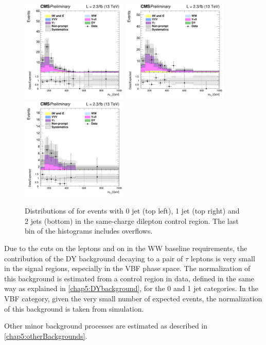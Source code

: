 \begin{figure}[htbp]
\centering
\includegraphics[width=0.45\textwidth]{images/13TeV/HighMass/cratio_hww2l2v_13TeV_ss_of0j_mTi_0j.png}
\includegraphics[width=0.45\textwidth]{images/13TeV/HighMass/cratio_hww2l2v_13TeV_ss_of1j_mTi_1j.png}
\includegraphics[width=0.45\textwidth]{images/13TeV/HighMass/cratio_hww2l2v_13TeV_ss_of2j_mTi_VBF.png}
\caption{
Distributions of \mti for events with 0 jet (top left), 1 jet (top right) and 2 jets (bottom) in the same-charge dilepton
control region. The last bin of the histograms includes overflows. %
}
\label{fig:13TeV_hm_samesign}
\end{figure}

Due to the cuts on the leptons \pt and on \mll in the WW baseline requirements, the contribution of the DY background decaying to a pair of $\tau$ leptons is very small in the signal regions, especially in the VBF phase space. The normalization of this background is estimated from a control region in data, defined in the same way as explained in \ref{chap5:DYbackground}, for the 0 and 1 jet categories. In the VBF category, given the very small number of expected events, the normalization of this background is taken from simulation.

Other minor background processes are estimated as described in \ref{chap5:otherBackgrounds}.













